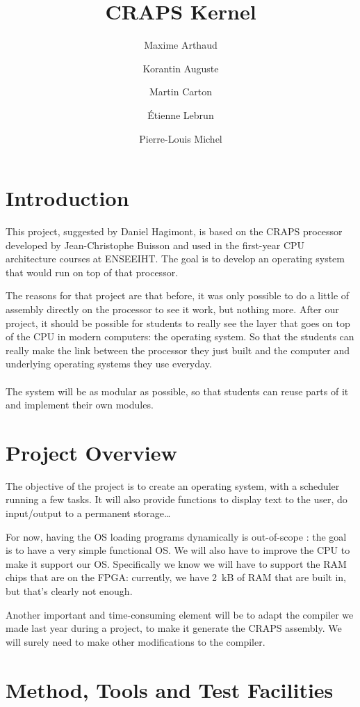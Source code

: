 \documentclass{article}
\title{CRAPS Kernel}
\author{
       Maxime Arthaud
  \and Korantin Auguste
  \and Martin Carton
  \and Étienne Lebrun
  \and Pierre-Louis Michel
}
\begin{document}
  
  \tableofcontents
  \newpage

  \section{Introduction}
    This project, suggested by Daniel Hagimont, is based on the CRAPS processor
    developed by Jean-Christophe Buisson and used in the first-year CPU
    architecture courses at ENSEEIHT. The goal is to develop an operating
    system that would run on top of that processor.

    The reasons for that project are that before, it was only possible to do a
    little of assembly directly on the processor to see it work, but nothing
    more.  After our project, it should be possible for students to really see
    the layer that goes on top of the CPU in modern computers: the operating
    system. So that the students can really make the link between the processor
    they just built and the computer and underlying operating systems they use
    everyday.

    \paragraph{}
    The system will be as modular as possible, so that students can reuse parts
    of it and implement their own modules.

  \section{Project Overview}
    The objective of the project is to create an operating system, with a
    scheduler running a few tasks. It will also provide functions to display
    text to the user, do input/output to a permanent storage\dots

    For now, having the OS loading programs dynamically is out-of-scope : the
    goal is to have a very simple functional OS.  We will also have to improve
    the CPU to make it support our OS. Specifically we know we will have to
    support the RAM chips that are on the FPGA: currently, we have \SI{2}{kB}
    of RAM that are built in, but that's clearly not enough.

    Another important
    and time-consuming element will be to adapt the compiler we made last year
    during a project, to make it generate the CRAPS assembly. We will
    surely need to make other modifications to the compiler.

  \section{Method, Tools and Test Facilities}
\end{document}
